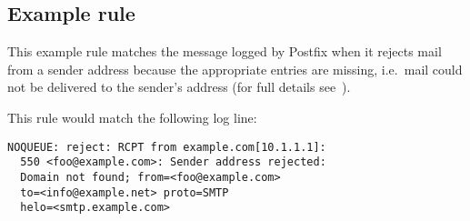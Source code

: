 \documentclass[a4paper,12pt,draft]{article}
\begin{document}
\subsection{Example rule}

\label{example rule}

This example rule matches the message logged by Postfix when it rejects
mail from a sender address because the appropriate \DNS{} entries are
missing, i.e.\ mail could not be delivered to the sender's address (for
full details see~\cite{reject-unknown-sender-domain}).

This rule would match the following log line:

\begin{verbatim}
NOQUEUE: reject: RCPT from example.com[10.1.1.1]:
  550 <foo@example.com>: Sender address rejected:
  Domain not found; from=<foo@example.com>
  to=<info@example.net> proto=SMTP
  helo=<smtp.example.com>
\end{verbatim}
\end{document}
